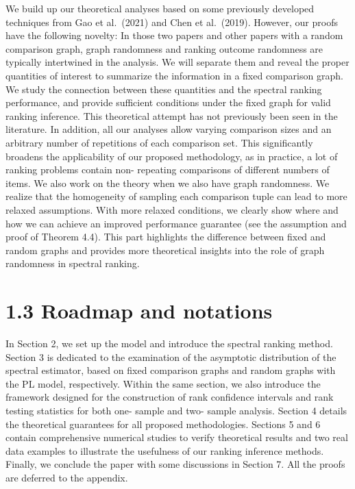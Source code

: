 We build up our theoretical analyses based on some previously developed
techniques from Gao et al.~(2021) and Chen et al.~(2019). However, our
proofs have the following novelty: In those two papers and other papers
with a random comparison graph, graph randomness and ranking outcome
randomness are typically intertwined in the analysis. We will separate
them and reveal the proper quantities of interest to summarize the
information in a fixed comparison graph. We study the connection between
these quantities and the spectral ranking performance, and provide
sufficient conditions under the fixed graph for valid ranking inference.
This theoretical attempt has not previously been seen in the literature.
In addition, all our analyses allow varying comparison sizes and an
arbitrary number of repetitions of each comparison set. This
significantly broadens the applicability of our proposed methodology, as
in practice, a lot of ranking problems contain non- repeating
comparisons of different numbers of items. We also work on the theory
when we also have graph randomness. We realize that the homogeneity of
sampling each comparison tuple can lead to more relaxed assumptions.
With more relaxed conditions, we clearly show where and how we can
achieve an improved performance guarantee (see the assumption and proof
of Theorem 4.4). This part highlights the difference between fixed and
random graphs and provides more theoretical insights into the role of
graph randomness in spectral ranking.

\section{1.3 Roadmap and notations}\label{roadmap-and-notations}

In Section 2, we set up the model and introduce the spectral ranking
method. Section 3 is dedicated to the examination of the asymptotic
distribution of the spectral estimator, based on fixed comparison graphs
and random graphs with the PL model, respectively. Within the same
section, we also introduce the framework designed for the construction
of rank confidence intervals and rank testing statistics for both one-
sample and two- sample analysis. Section 4 details the theoretical
guarantees for all proposed methodologies. Sections 5 and 6 contain
comprehensive numerical studies to verify theoretical results and two
real data examples to illustrate the usefulness of our ranking inference
methods. Finally, we conclude the paper with some discussions in Section
7. All the proofs are deferred to the appendix.

